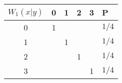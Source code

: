 \begin{tabular}{c|c|c|c|c||l|}
$W_1(x|y)$ & 0 & 1 & 2 & 3 & P     \\ \hline
0          & 1 &   &   &   & $1/4$ \\ \hline
1          &   & 1 &   &   & $1/4$ \\ \hline
2          &   &   & 1 &   & $1/4$ \\ \hline
3          &   &   &   & 1 & $1/4$ \\ \hline
\end{tabular}
